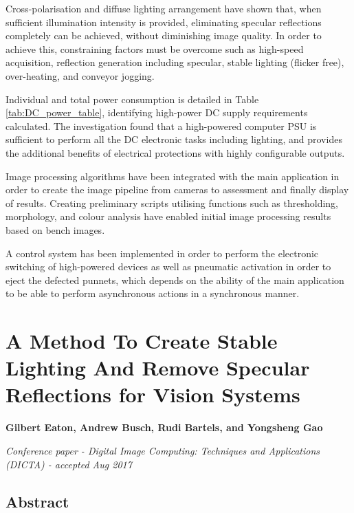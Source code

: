 \documentclass[fleqn,twoside,12pt]{report}
\begin{document}
Cross-polarisation and diffuse lighting arrangement have shown that, when sufficient illumination intensity is provided, eliminating specular reflections completely can be achieved, without diminishing image quality. In order to achieve this, constraining factors must be overcome such as high-speed acquisition, reflection generation including specular, stable lighting (flicker free), over-heating, and conveyor jogging. 

Individual and total power consumption is detailed in Table \ref{tab:DC_power_table}, identifying high-power DC supply requirements calculated. The investigation found that a high-powered computer PSU is sufficient to perform all the DC electronic tasks including lighting, and provides the additional benefits of electrical protections with highly configurable outputs.

Image processing algorithms have been integrated with the main application in order to create the image pipeline from cameras to assessment and finally display of results. Creating preliminary scripts utilising functions such as thresholding, morphology, and colour analysis have enabled initial image processing results based on bench images.


A control system has been implemented in order to perform the electronic switching of high-powered devices as well as pneumatic activation in order to eject the defected punnets, which depends on the ability of the main application to be able to perform asynchronous actions in a synchronous manner.




\newpage
\chapter{A Method To Create Stable Lighting And Remove Specular Reflections for Vision Systems}
\label{sec:paper_1}

\textbf{Gilbert Eaton, Andrew Busch, Rudi Bartels, and Yongsheng Gao}

\textit{Conference paper - Digital Image Computing: Techniques and Applications (DICTA) - accepted Aug 2017}


\section{Abstract}
\end{document}
